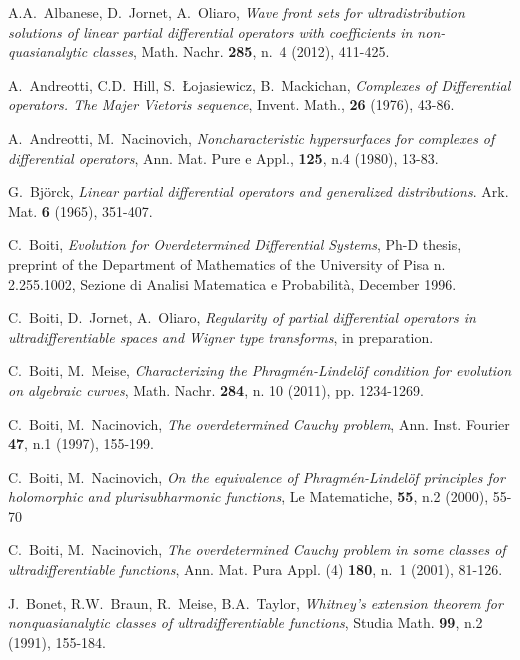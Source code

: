 \documentclass[twoside]{amsart}
\begin{document}
\begin{thebibliography}{AAAA}

  A.A.~Albanese, D.~Jornet, A.~Oliaro, {\em Wave front sets for
    ultradistribution solutions of linear partial differential operators
    with coefficients in non-quasianalytic classes}, Math. Nachr. {\bf 285},
  n.~4 (2012), 411-425.
 
A.~Andreotti, C.D.~Hill, S.~\L ojasiewicz,
B.~Mackichan, \emph{Complexes of Differential operators. The Majer
Vietoris sequence}, Invent. Math., {\bf 26} (1976), 43-86.

A.~Andreotti, M.~Nacinovich, \emph{Noncharacteristic
hypersurfaces for complexes of differential operators}, Ann. Mat.
Pure e Appl., \textbf{125}, n.4 (1980), 13-83.

G.~Bj\"{o}rck,\emph{ Linear partial differential operators and generalized
distributions}. Ark. Mat. \textbf{6} (1965), 351-407.

C.~Boiti, {\em Evolution for  Overdetermined Differential
Systems}, Ph-D thesis,
preprint of the Department of Mathematics of the University of Pisa
 n. 2.255.1002,
Sezione di Analisi Matematica e Probabilit\`a, December 1996.

C.~Boiti, D.~Jornet, A.~Oliaro, {\em Regularity of partial differential 
operators in ultradifferentiable spaces and Wigner type transforms}, 
in preparation.

C.~Boiti, M.~Meise, {\em Characterizing
the Phragm\'en-Lindel\"of condition for evolution on algebraic curves},
Math. Nachr. {\bf 284}, n. 10 (2011), pp. 1234-1269.

C.~Boiti, M.~Nacinovich, \emph{The overdetermined
Cauchy problem},  Ann. Inst. Fourier \textbf{47}, n.1 (1997),
155-199.

C.~Boiti, M.~Nacinovich, \emph{On the equivalence
of Phragm\'en-Lindel\"{o}f principles for holomorphic and plurisubharmonic
functions}, Le Matematiche, \textbf{55}, n.2 (2000), 55-70

C.~Boiti, M.~Nacinovich, \emph{The overdetermined
Cauchy problem in some classes of ultradifferentiable functions},
 Ann. Mat. Pura Appl. (4) {\bf 180}, n.~1 (2001), 81-126. 

J.~Bonet, R.W.~Braun, R.~Meise, B.A.~Taylor, \emph{Whitney's
extension theorem for nonquasianalytic classes of ultradifferentiable
functions},  Studia Math. \textbf{99}, n.2 (1991), 155-184.


\end{thebibliography}
\end{document}

